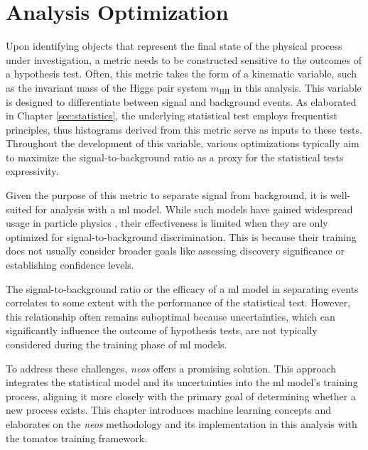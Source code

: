 \chapter{Analysis Optimization}\label{sec:analysis_optimization}
Upon identifying objects that represent the final state of the physical process under investigation, a metric needs to be constructed sensitive to the outcomes of a hypothesis test. Often, this metric takes the form of a kinematic variable, such as the invariant mass of the Higgs pair system $m_\text{HH}$ in this analysis. This variable is designed to differentiate between signal and background events. As elaborated in Chapter \ref{sec:statistics}, the underlying statistical test employs frequentist principles, thus histograms derived from this metric serve as inputs to these tests. Throughout the development of this variable, various optimizations typically aim to maximize the signal-to-background ratio as a proxy for the statistical tests expressivity.

Given the purpose of this metric to separate signal from background, it is well-suited for analysis with a \ac{ml} model. While such models have gained widespread usage in particle physics \citep{albertsson2019machine,shlomi2020graph,feickert2021living,Schwartz2021Modern}, their effectiveness is limited when they are only optimized for signal-to-background discrimination. This is because their training does not usually consider broader goals like assessing discovery significance or establishing confidence levels.

The signal-to-background ratio or the efficacy of a \ac{ml} model in separating events correlates to some extent with the performance of the statistical test. However, this relationship often remains suboptimal because uncertainties, which can significantly influence the outcome of hypothesis tests, are not typically considered during the training phase of \ac{ml} models.

To address these challenges, \textit{\ac{neos}} \citep{Simpson_2023} offers a promising solution. This approach integrates the statistical model and its uncertainties into the \ac{ml} model's training process, aligning it more closely with the primary goal of determining whether a new process exists. This chapter introduces machine learning concepts and elaborates on the \textit{\ac{neos}} methodology and its implementation in this analysis with the \ac{tomatos} training framework.


